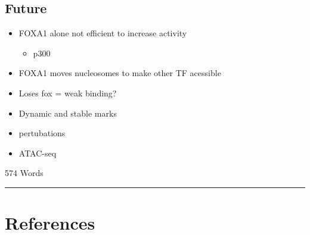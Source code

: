 \documentclass[
  12pt,
]{article}
\providecommand{\tightlist}{%
  \setlength{\itemsep}{0pt}\setlength{\parskip}{0pt}}
\begin{document}
\hypertarget{future}{%
\subsection{Future}\label{future}}

\begin{itemize}
\item
  FOXA1 alone not efficient to increase activity

  \begin{itemize}
  \tightlist
  \item
    p300
  \end{itemize}
\item
  FOXA1 moves nucleosomes to make other TF acessible
\item
  Loses fox = weak binding?
\item
  Dynamic and stable marks
\item
  pertubations
\end{itemize}

\begin{itemize}
\tightlist
\item
  ATAC-seq
\end{itemize}

\begin{flushright}
574 Words
\end{flushright}

\begin{center}\rule{0.5\linewidth}{0.5pt}\end{center}

\hypertarget{references}{%
\section*{References}\label{references}}
\end{document}
